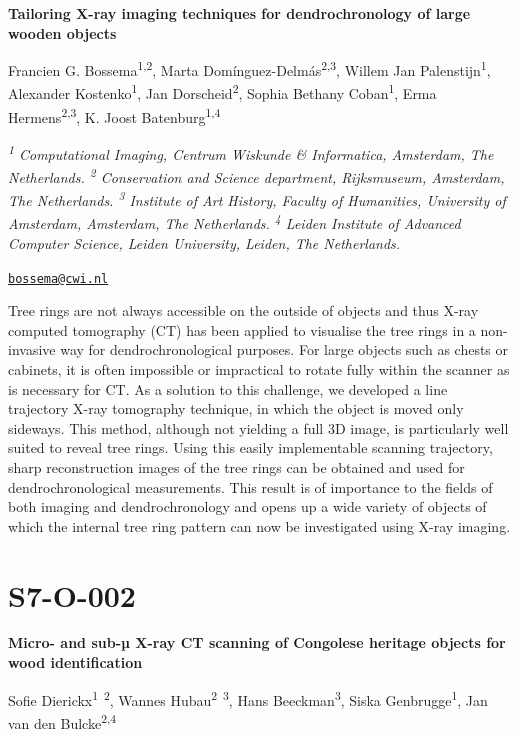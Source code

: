 \documentclass[
]{book}
\begin{document}
\textbf{Tailoring X-ray imaging techniques for dendrochronology of large wooden objects}

Francien G. Bossema\textsuperscript{1,2}, Marta Domínguez-Delmás\textsuperscript{2,3}, Willem Jan Palenstijn\textsuperscript{1}, Alexander Kostenko\textsuperscript{1}, Jan Dorscheid\textsuperscript{2}, Sophia Bethany Coban\textsuperscript{1}, Erma Hermens\textsuperscript{2,3}, K. Joost Batenburg\textsuperscript{1,4}

\emph{\textsuperscript{1} Computational Imaging, Centrum Wiskunde \& Informatica, Amsterdam, The Netherlands. \textsuperscript{2} Conservation and Science department, Rijksmuseum, Amsterdam, The Netherlands. \textsuperscript{3} Institute of Art History, Faculty of Humanities, University of Amsterdam, Amsterdam, The Netherlands. \textsuperscript{4} Leiden Institute of Advanced Computer Science, Leiden University, Leiden, The Netherlands.}

\href{mailto:bossema@cwi.nl}{\nolinkurl{bossema@cwi.nl}}

Tree rings are not always accessible on the outside of objects and thus X-ray computed tomography (CT) has been applied to visualise the tree rings in a non-invasive way for dendrochronological purposes. For large objects such as chests or cabinets, it is often impossible or impractical to rotate fully within the scanner as is necessary for CT. As a solution to this challenge, we developed a line trajectory X-ray tomography technique, in which the object is moved only sideways. This method, although not yielding a full 3D image, is particularly well suited to reveal tree rings. Using this easily implementable scanning trajectory, sharp reconstruction images of the tree rings can be obtained and used for dendrochronological measurements. This result is of importance to the fields of both imaging and dendrochronology and opens up a wide variety of objects of which the internal tree ring pattern can now be investigated using X-ray imaging.

\hypertarget{s7-o-002}{%
\section*{S7-O-002}\label{s7-o-002}}

\textbf{Micro- and sub-µ X-ray CT scanning of Congolese heritage objects for wood identification}

Sofie Dierickx\textsuperscript{1~2}, Wannes Hubau\textsuperscript{2~3}, Hans Beeckman\textsuperscript{3}, Siska Genbrugge\textsuperscript{1}, Jan van den Bulcke\textsuperscript{2,4}
\end{document}
